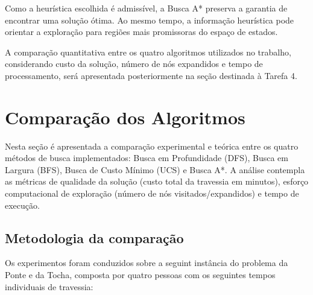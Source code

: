 \documentclass[12pt,a4paper]{article}
\begin{document}
Como a heurística escolhida é admissível, a Busca A* preserva a garantia de
encontrar uma solução ótima. Ao mesmo tempo, a informação heurística pode
orientar a exploração para regiões mais promissoras do espaço de estados.

A comparação quantitativa entre os quatro algoritmos utilizados no trabalho,
considerando custo da solução, número de nós expandidos e tempo de
processamento, será apresentada posteriormente na seção destinada à Tarefa 4.





\section{Comparação dos Algoritmos}
\label{sec:comparacao-algoritmos}
%
%
%
Nesta seção é apresentada a comparação experimental e teórica entre os quatro métodos 
de busca implementados: Busca em Profundidade (DFS), Busca em Largura (BFS), 
Busca de Custo Mínimo (UCS) e Busca A*. A análise contempla as métricas de qualidade da 
solução (custo total da travessia em minutos), esforço computacional de exploração 
(número de nós visitados/expandidos) e tempo de execução.

\subsection{Metodologia da comparação}
\label{subsec:metodologia}
Os experimentos foram conduzidos sobre a seguint instância  do problema da Ponte e da 
Tocha, composta por quatro pessoas com os seguintes tempos individuais de travessia:
\end{document}
